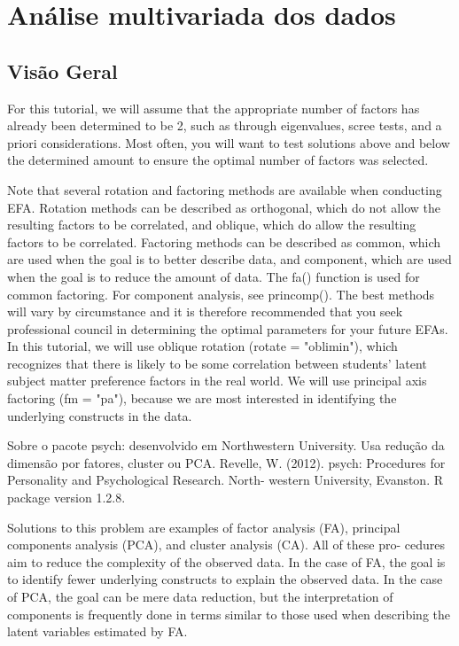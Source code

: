 \chapter{Análise multivariada dos dados}

\section{Visão Geral}

For this tutorial, we will assume that the appropriate number of factors has already been determined to be 2, such as through eigenvalues, scree tests, and a priori considerations. Most often, you will want to test solutions above and below the determined amount to ensure the optimal number of factors was selected.

Note that several rotation and factoring methods are available when conducting EFA. Rotation methods can be described as orthogonal, which do not allow the resulting factors to be correlated, and oblique, which do allow the resulting factors to be correlated. Factoring methods can be described as common, which are used when the goal is to better describe data, and component, which are used when the goal is to reduce the amount of data. The fa() function is used for common factoring. For component analysis, see princomp(). The best methods will vary by circumstance and it is therefore recommended that you seek professional council in determining the optimal parameters for your future EFAs.
In this tutorial, we will use oblique rotation (rotate = "oblimin"), which recognizes that there is likely to be some correlation between students' latent subject matter preference factors in the real world. We will use principal axis factoring (fm = "pa"), because we are most interested in identifying the underlying constructs in the data.

Sobre o pacote psych: desenvolvido em Northwestern University. Usa redução da dimensão por fatores, cluster ou PCA.
Revelle, W. (2012). psych: Procedures for Personality and Psychological Research. North-
western University, Evanston. R package version 1.2.8.

Solutions to this problem are examples of factor analysis
(FA), principal components analysis (PCA), and cluster analysis (CA). All of these pro-
cedures aim to reduce the complexity of the observed data. In the case of FA, the goal is
to identify fewer underlying constructs to explain the observed data. In the case of PCA,
the goal can be mere data reduction, but the interpretation of components is frequently
done in terms similar to those used when describing the latent variables estimated by FA.

